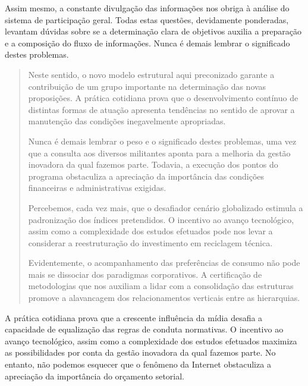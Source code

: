 \documentclass[fleqn]{profmat-cefet}
\begin{document}
Assim mesmo, a constante divulgação das informações nos obriga à análise do
sistema de participação geral. Todas estas questões, devidamente ponderadas,
levantam dúvidas sobre se a determinação clara de objetivos auxilia a preparação
e a composição do fluxo de informações. Nunca é demais lembrar o significado destes
problemas.

\begin{quotation}
    Neste sentido, o novo modelo estrutural aqui preconizado garante a contribuição
    de um grupo importante na determinação das novas proposições. A prática
    cotidiana prova que o desenvolvimento contínuo de distintas formas de atuação
    apresenta tendências no sentido de aprovar a manutenção das condições
    inegavelmente apropriadas. 
    
    Nunca é demais lembrar o peso e o significado destes
    problemas, uma vez que a consulta aos diversos militantes aponta para a melhoria
    da gestão inovadora da qual fazemos parte. Todavia, a execução dos pontos do
    programa obstaculiza a apreciação da importância das condições financeiras e
    administrativas exigidas. 
    
    Percebemos, cada vez mais, que o desafiador cenário globalizado estimula a
    padronização dos índices pretendidos. O incentivo ao avanço tecnológico, assim
    como a complexidade dos estudos efetuados pode nos levar a considerar a
    reestruturação do investimento em reciclagem técnica. 
    
    Evidentemente, o acompanhamento das preferências de consumo não pode mais se 
    dissociar dos paradigmas corporativos. A certificação de metodologias que nos 
    auxiliam a lidar com a consolidação das estruturas promove a alavancagem dos 
    relacionamentos verticais entre as hierarquias. 
\end{quotation}

A prática cotidiana prova que a crescente influência da mídia desafia a
capacidade de equalização das regras de conduta normativas. 
O incentivo ao avanço tecnológico, assim como a complexidade dos estudos
efetuados maximiza as possibilidades por conta da gestão inovadora da qual
fazemos parte.
No entanto, não podemos esquecer que o fenômeno da Internet obstaculiza a
apreciação da importância do orçamento setorial. 
\end{document}
